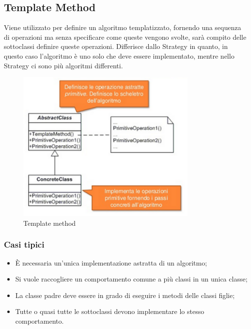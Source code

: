 \subsection{Template Method}
Viene utilizzato per definire un algoritmo templatizzato, fornendo una sequenza di operazioni ma senza specificare come queste vengono svolte, sarà compito delle sottoclassi definire queste operazioni.
Differisce dallo Strategy in quanto, in questo caso l'algoritmo è uno solo che deve essere implementato, mentre nello Strategy ci sono più algoritmi differenti.

\begin{figure}[ht]
    \centering
    \includegraphics[width=0.8\textwidth]{immagini/templateMethod.png}
    \caption{Template method}
\end{figure}
\FloatBarrier

\subsubsection{Casi tipici}
\begin{itemize}
\item \`{E} necessaria un'unica implementazione astratta di un algoritmo;
\item Si vuole raccogliere un comportamento comune a più classi in un unica classe;
\item La classe padre deve essere in grado di eseguire i metodi delle classi figlie;
\item Tutte o quasi tutte le sottoclassi devono implementare lo stesso comportamento.
\end{itemize}